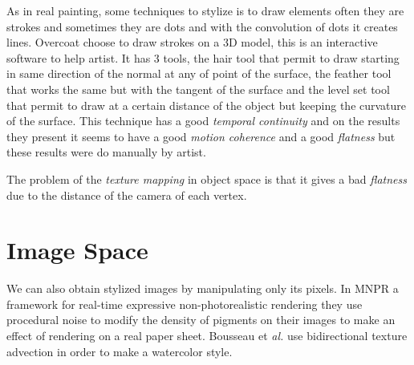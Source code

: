 As in real painting, some techniques to stylize is to draw elements often they are strokes and sometimes they are dots and with the convolution of dots it creates lines. Overcoat\cite{schmid_overcoat:_2011} choose to draw strokes on a 3D model, this is an interactive software to help artist. It has 3 tools, the hair tool that permit to draw starting in same direction of the normal at any of point of the surface, the feather tool that works the same but with the tangent of the surface and the level set tool that permit to draw at a certain distance of the object but keeping the curvature of the surface. This technique has a good \textit{temporal continuity} and on the results they present it seems to have a good \textit{motion coherence} and a good \textit{flatness} but these results were do manually by artist.

The problem of the \textit{texture mapping} in object space is that it gives a bad \textit{flatness} due to the distance of the camera of each vertex.

\section{Image Space}

We can also obtain stylized images by manipulating only its pixels. In MNPR\cite{montesdeoca_mnpr:_2018} a framework for real-time expressive non-photorealistic rendering they use procedural noise to modify the density of pigments on their images to make an effect of rendering on a real paper sheet. Bousseau et \textit{al.}\cite{bousseau_video_2007} use bidirectional texture advection in order to make a watercolor style.
